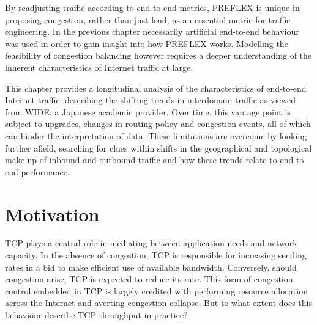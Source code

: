 By readjusting traffic according to end-to-end metrics, \ac{PREFLEX} is unique in proposing congestion, rather than just load, as an essential metric for traffic engineering.
In the previous chapter necessarily artificial end-to-end behaviour was used in order to gain insight into how \ac{PREFLEX} works.
Modelling the feasibility of congestion balancing however requires a deeper understanding of the inherent characteristics of Internet traffic at large.

This chapter provides a longitudinal analysis of the characteristics of end-to-end Internet traffic, describing the shifting trends in interdomain traffic as viewed from \acs{WIDE}, a Japanese academic provider.
Over time, this vantage point is subject to upgrades, changes in routing policy and congestion events, all of which can hinder the interpretation of data.
These limitations are overcome by looking further afield, searching for clues within shifts in the geographical and topological make-up of inbound and outbound traffic and how these trends relate to end-to-end performance.

\section{Motivation}

\ac{TCP} plays a central role in mediating between application needs and network capacity.
In the absence of congestion, \ac{TCP} is responsible for increasing sending rates in a bid to make efficient use of available bandwidth.
Conversely, should congestion arise, \ac{TCP} is expected to reduce its rate.
This form of congestion control embedded in \ac{TCP} is largely credited with performing resource allocation across the Internet and averting congestion collapse.
But to what extent does this behaviour describe \ac{TCP} throughput in practice?

